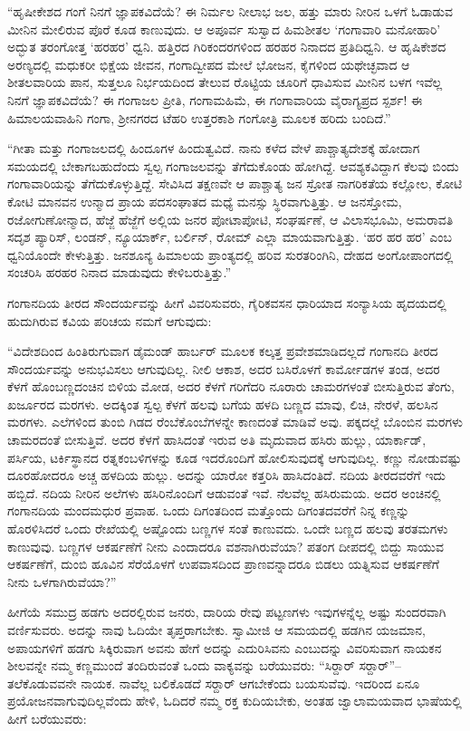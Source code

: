  “ಹೃಷೀಕೇಶದ ಗಂಗೆ ನಿನಗೆ ಜ್ಞಾಪಕವಿದೆಯೆ? ಈ ನಿರ್ಮಲ ನೀಲಾಭ ಜಲ, ಹತ್ತು ಮಾರು ನೀರಿನ ಒಳಗೆ ಓಡಾಡುವ ಮೀನಿನ ಮೇಲಿರುವ ಪೊರೆ ಕೂಡ ಕಾಣುವುದು. ಆ ಅಪೂರ್ವ ಸುಸ್ವಾದ ಹಿಮಶೀತಲ ‘ಗಂಗಾವಾರಿ ಮನೋಹಾರಿ’ ಅದ್ಭುತ ತರಂಗೋತ್ತ ‘ಹರಹರ’ ಧ್ವನಿ. ಹತ್ತಿರದ ಗಿರಿಕಂದರಗಳಿಂದ ಹರಹರ ನಿನಾದದ ಪ್ರತಿದಿಧ್ವನಿ. ಆ ಹೃಷಿಕೇಶದ ಅರಣ್ಯದಲ್ಲಿ ಮಧುಕರೀ ಭಿಕ್ಷೆಯ ಜೀವನ, ಗಂಗಾದ್ವೀಪದ ಮೇಲೆ ಭೋಜನ, ಕೈಗಳಿಂದ ಯಥೇಚ್ಛವಾದ ಆ ಶೀತಲವಾರಿಯ ಪಾನ, ಸುತ್ತಲೂ ನಿರ್ಭಯದಿಂದ ತೇಲುವ ರೊಟ್ಟಿಯ ಚೂರಿಗೆ ಧಾವಿಸುವ ಮೀನಿನ ಬಳಗ ಇವೆಲ್ಲ ನಿನಗೆ ಜ್ಞಾಪಕವಿದೆಯೆ? ಈ ಗಂಗಾಜಲ ಪ್ರೀತಿ, ಗಂಗಾಮಹಿಮೆ, ಈ ಗಂಗಾವಾರಿಯ ವೈರಾಗ್ಯಪ್ರದ ಸ್ಪರ್ಶ! ಈ ಹಿಮಾಲಯವಾಹಿನಿ ಗಂಗಾ, ಶ‍್ರೀನಗರದ ಟೆಹರಿ ಉತ್ತರಕಾಶಿ ಗಂಗೋತ್ರಿ ಮೂಲಕ ಹರಿದು ಬಂದಿದೆ.” 

 “ಗೀತಾ ಮತ್ತು ಗಂಗಾಜಲದಲ್ಲಿ ಹಿಂದೂಗಳ ಹಿಂದುತ್ವವಿದೆ. ನಾನು ಕಳೆದ ವೇಳೆ ಪಾಶ್ಚಾತ್ಯದೇಶಕ್ಕೆ ಹೋದಾಗ ಸಮಯದಲ್ಲಿ ಬೇಕಾಗಬಹುದೆಂದು ಸ್ವಲ್ಪ ಗಂಗಾಜಲವನ್ನು ತೆಗೆದುಕೊಂಡು ಹೋಗಿದ್ದೆ. ಆವಶ್ಯಕವಿದ್ದಾಗ ಕೆಲವು ಬಿಂದು ಗಂಗಾವಾರಿಯನ್ನು ತೆಗೆದುಕೊಳ್ಳುತ್ತಿದ್ದೆ. ಸೇವಿಸಿದ ತಕ್ಷಣವೇ ಆ ಪಾಶ್ಚಾತ್ಯ ಜನ ಸ್ರೋತ ನಾಗರಿಕತೆಯ ಕಲ್ಲೋಲ, ಕೋಟಿ ಕೋಟಿ ಮಾನವನ ಉನ್ಮಾದ ಪ್ರಾಯ ಪದಸಂಘಾತದ ಮಧ್ಯೆ ಮನಸ್ಸು ಸ್ಥಿರವಾಗುತ್ತಿತ್ತು. ಆ ಜನಸ್ತೋಮ, ರಜೋಗುಣೋನ್ಮಾದ, ಹೆಜ್ಜೆ ಹೆಜ್ಜೆಗೆ ಅಲ್ಲಿಯ ಜನರ ಪೋಟಾಪೋಟಿ, ಸಂಘರ್ಷಣೆ, ಆ ವಿಲಾಸಭೂಮಿ, ಅಮರಾವತಿ ಸದೃಶ ಪ್ಯಾರಿಸ್, ಲಂಡನ್, ನ್ಯೂಯಾರ್ಕ್, ಬರ್ಲಿನ್, ರೋಮ್ ಎಲ್ಲಾ ಮಾಯವಾಗುತ್ತಿತ್ತು. ‘ಹರ ಹರ ಹರ’ ಎಂಬ ಧ್ವನಿಯೊಂದೇ ಕೇಳುತ್ತಿತ್ತು. ಜನಶೂನ್ಯ ಹಿಮಾಲಯ ಪ್ರಾಂತ್ಯದಲ್ಲಿ ಹರಿವ ಸುರತರಿಂಗಿನಿ, ದೇಹದ ಅಂಗೋಪಾಂಗದಲ್ಲಿ ಸಂಚರಿಸಿ ಹರಹರ ನಿನಾದ ಮಾಡುವುದು ಕೇಳಿಬರುತ್ತಿತ್ತು.” 

 ಗಂಗಾನದಿಯ ತೀರದ ಸೌಂದರ್ಯವನ್ನು ಹೀಗೆ ವಿವರಿಸುವರು, ಗೈರಿಕವಸನ ಧಾರಿಯಾದ ಸಂನ್ಯಾಸಿಯ ಹೃದಯದಲ್ಲಿ ಹುದುಗಿರುವ ಕವಿಯ ಪರಿಚಯ ನಮಗೆ ಆಗುವುದು: 

 “ವಿದೇಶದಿಂದ ಹಿಂತಿರುಗುವಾಗ ಡೈಮಂಡ್ ಹಾರ್ಬರ್ ಮೂಲಕ ಕಲ್ಕತ್ತ ಪ್ರವೇಶಮಾಡಿದಲ್ಲದೆ ಗಂಗಾನದಿ ತೀರದ ಸೌಂದರ್ಯವನ್ನು ಅನುಭವಿಸಲು ಆಗುವುದಿಲ್ಲ. ನೀಲಿ ಆಕಾಶ, ಅದರ ಬಸಿರೊಳಗೆ ಕಾರ್ಮೋಡಗಳ ತಂಡ, ಅದರ ಕೆಳಗೆ ಹೊಂಬಣ್ಣದಂಚಿನ ಬಿಳಿಯ ಮೋಡ, ಅದರ ಕೆಳಗೆ ಗರಿಗೆದರಿ ನೂರಾರು ಚಾಮರಗಳಂತೆ ಬೀಸುತ್ತಿರುವ ತೆಂಗು, ಖರ್ಜೂರದ ಮರಗಳು. ಅದಕ್ಕಿಂತ ಸ್ವಲ್ಪ ಕೆಳಗೆ ಹಲವು ಬಗೆಯ ಹಳದಿ ಬಣ್ಣದ ಮಾವು, ಲಿಚಿ, ನೇರಳೆ, ಹಲಸಿನ ಮರಗಳು. ಎಲೆಗಳಿಂದ ತುಂಬಿ ಗಿಡದ ರೆಂಬೆಕೊಂಬೆಗಳನ್ನೇ ಕಾಣದಂತೆ ಮಾಡಿವೆ ಅವು. ಪಕ್ಕದಲ್ಲೆ ಬೊಂಬಿನ ಮರಗಳು ಚಾಮರದಂತೆ ಬೀಸುತ್ತಿವೆ. ಅದರ ಕೆಳಗೆ ಹಾಸಿದಂತೆ ಇರುವ ಅತಿ ಮೃದುವಾದ ಹಸಿರು ಹುಲ್ಲು, ಯಾರ್ಕಾಡ್, ಪರ್ಸಿಯ, ಟರ್ಕಿಸ್ಥಾನದ ರತ್ನಕಂಬಳಿಗಳನ್ನು ಕೂಡ ಇದರೊಂದಿಗೆ ಹೋಲಿಸುವುದಕ್ಕೆ ಆಗುವುದಿಲ್ಲ. ಕಣ್ಣು ನೋಡುವಷ್ಟು ದೂರಹೋದರೂ ಅಚ್ಚ ಹಳದಿಯ ಹುಲ್ಲು. ಅದನ್ನು ಯಾರೋ ಕತ್ತರಿಸಿ ಹಾಸಿದಂತಿದೆ. ನದಿಯ ತೀರದವರೆಗೆ ಇದು ಹಬ್ಬಿದೆ. ನದಿಯ ನೀರಿನ ಅಲೆಗಳು ಹಸಿರಿನೊಂದಿಗೆ ಆಡುವಂತೆ ಇವೆ. ನೆಲವೆಲ್ಲ ಹಸಿರುಮಯ. ಅದರ ಅಂಚಿನಲ್ಲಿ ಗಂಗಾನದಿಯ ಮಂದಮಧುರ ಪ್ರವಾಹ. ಒಂದು ದಿಗಂತದಿಂದ ಮತ್ತೊಂದು ದಿಗಂತದವರೆಗೆ ನಿನ್ನ ಕಣ್ಣನ್ನು ಹೊರಳಿಸಿದರೆ ಒಂದು ರೇಖೆಯಲ್ಲಿ ಅಷ್ಟೊಂದು ಬಣ್ಣಗಳ ಸಂತೆ ಕಾಣುವದು. ಒಂದೇ ಬಣ್ಣದ ಹಲವು ತರತಮಗಳು ಕಾಣುವುವು. ಬಣ್ಣಗಳ ಆಕರ್ಷಣೆಗೆ ನೀನು ಎಂದಾದರೂ ವಶನಾಗಿರುವೆಯಾ? ಪತಂಗ ದೀಪದಲ್ಲಿ ಬಿದ್ದು ಸಾಯುವ ಆಕರ್ಷಣೆಗೆ, ದುಂಬಿ ಹೂವಿನ ಸೆರೆಯೊಳಗೆ ಉಪವಾಸದಿಂದ ಪ್ರಾಣವನ್ನಾದರೂ ಬಿಡಲು ಯತ್ನಿಸುವ ಆಕರ್ಷಣೆಗೆ ನೀನು ಒಳಗಾಗಿರುವೆಯಾ?” 

 ಹೀಗೆಯೆ ಸಮುದ್ರ ಹಡಗು ಅದರಲ್ಲಿರುವ ಜನರು, ದಾರಿಯ ರೇವು ಪಟ್ಟಣಗಳು ಇವುಗಳನ್ನೆಲ್ಲ ಅಷ್ಟು ಸುಂದರವಾಗಿ ವರ್ಣಿಸುವರು. ಅದನ್ನು ನಾವು ಓದಿಯೇ ತೃಪ್ತರಾಗಬೇಕು. ಸ್ವಾಮೀಜಿ ಆ ಸಮಯದಲ್ಲಿ ಹಡಗಿನ ಯಜಮಾನ, ಅಪಾಯಗಳಿಗೆ ಹಡಗು ಸಿಕ್ಕಿರುವಾಗ ಅವನು ಹೇಗೆ ಅದನ್ನು ಎದುರಿಸಿವನು ಎಂಬುದನ್ನು ವಿವರಿಸುವಾಗ ನಾಯಕನ ಶೀಲವನ್ನೇ ನಮ್ಮ ಕಣ್ಣಮುಂದೆ ತಂದಿರುವಂತೆ ಒಂದು ವಾಕ್ಯವನ್ನು ಬರೆಯುವರು: “ಸಿರ್‍ದಾರ್ ಸರ್‍ದಾರ್”– ತಲೆಕೊಡುವವನೇ ನಾಯಕ. ನಾವೆಲ್ಲ ಬಲಿಕೊಡದೆ ಸರ್‍ದಾರ್ ಆಗಬೇಕೆಂದು ಬಯಸುವೆವು. ಇದರಿಂದ ಏನೂ ಪ್ರಯೋಜನವಾಗುವುದಿಲ್ಲವೆಂದು ಹೇಳಿ, ಓದಿದರೆ ನಮ್ಮ ರಕ್ತ ಕುದಿಯಬೇಕು, ಅಂತಹ ಜ್ವಾಲಾಮಯವಾದ ಭಾಷೆಯಲ್ಲಿ ಹೀಗೆ ಬರೆಯುವರು: 

